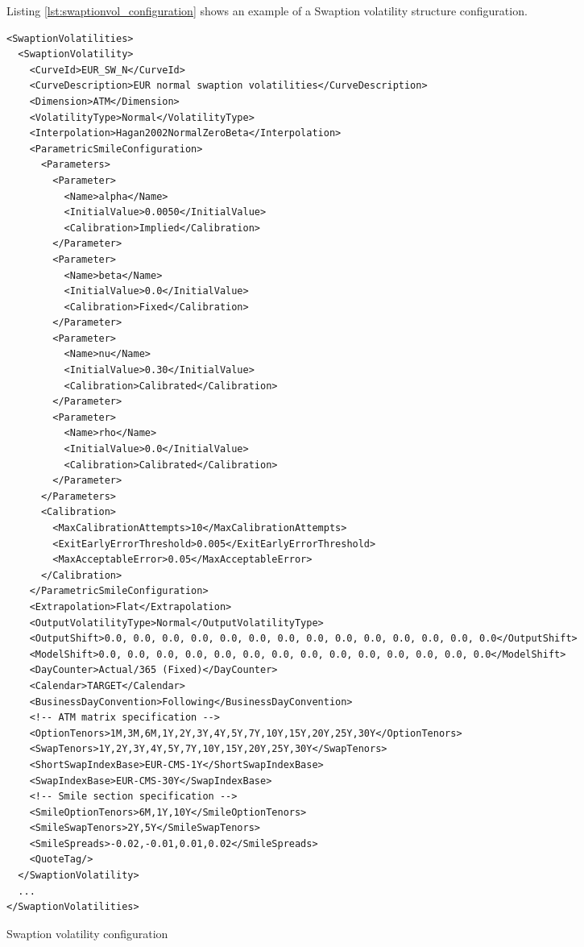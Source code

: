 Listing \ref{lst:swaptionvol_configuration} shows an example of a Swaption volatility structure configuration.

\begin{longlisting}
\begin{verbatim}
<SwaptionVolatilities>
  <SwaptionVolatility>
    <CurveId>EUR_SW_N</CurveId>
    <CurveDescription>EUR normal swaption volatilities</CurveDescription>
    <Dimension>ATM</Dimension>
    <VolatilityType>Normal</VolatilityType>
    <Interpolation>Hagan2002NormalZeroBeta</Interpolation>
    <ParametricSmileConfiguration>
      <Parameters>
        <Parameter>
          <Name>alpha</Name>
          <InitialValue>0.0050</InitialValue>
          <Calibration>Implied</Calibration>
        </Parameter>
        <Parameter>
          <Name>beta</Name>
          <InitialValue>0.0</InitialValue>
          <Calibration>Fixed</Calibration>
        </Parameter>
        <Parameter>
          <Name>nu</Name>
          <InitialValue>0.30</InitialValue>
          <Calibration>Calibrated</Calibration>
        </Parameter>
        <Parameter>
          <Name>rho</Name>
          <InitialValue>0.0</InitialValue>
          <Calibration>Calibrated</Calibration>
        </Parameter>
      </Parameters>
      <Calibration>
        <MaxCalibrationAttempts>10</MaxCalibrationAttempts>
        <ExitEarlyErrorThreshold>0.005</ExitEarlyErrorThreshold>
        <MaxAcceptableError>0.05</MaxAcceptableError>
      </Calibration>
    </ParametricSmileConfiguration>
    <Extrapolation>Flat</Extrapolation>
    <OutputVolatilityType>Normal</OutputVolatilityType>
    <OutputShift>0.0, 0.0, 0.0, 0.0, 0.0, 0.0, 0.0, 0.0, 0.0, 0.0, 0.0, 0.0, 0.0, 0.0</OutputShift>
    <ModelShift>0.0, 0.0, 0.0, 0.0, 0.0, 0.0, 0.0, 0.0, 0.0, 0.0, 0.0, 0.0, 0.0, 0.0</ModelShift>
    <DayCounter>Actual/365 (Fixed)</DayCounter>
    <Calendar>TARGET</Calendar>
    <BusinessDayConvention>Following</BusinessDayConvention>
    <!-- ATM matrix specification -->
    <OptionTenors>1M,3M,6M,1Y,2Y,3Y,4Y,5Y,7Y,10Y,15Y,20Y,25Y,30Y</OptionTenors>
    <SwapTenors>1Y,2Y,3Y,4Y,5Y,7Y,10Y,15Y,20Y,25Y,30Y</SwapTenors>
    <ShortSwapIndexBase>EUR-CMS-1Y</ShortSwapIndexBase>
    <SwapIndexBase>EUR-CMS-30Y</SwapIndexBase>
    <!-- Smile section specification -->
    <SmileOptionTenors>6M,1Y,10Y</SmileOptionTenors>
    <SmileSwapTenors>2Y,5Y</SmileSwapTenors>
    <SmileSpreads>-0.02,-0.01,0.01,0.02</SmileSpreads>
    <QuoteTag/>
  </SwaptionVolatility>
  ...
</SwaptionVolatilities>
\end{verbatim}
\caption{Swaption volatility configuration}
\label{lst:swaptionvol_configuration}
\end{longlisting}

